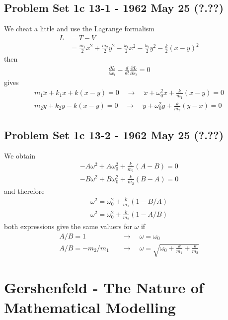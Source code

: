\documentclass[10pt,a4paper]{book}
\theoremstyle{definition}
\begin{document}
\subsection{Problem Set 1c 13-1 - 1962 May 25 (?.??)}
We cheat a little and use the Lagrange formalism 
\begin{align}
L&=T-V\\
&=\frac{m_1}{2}\dot{x}^2+\frac{m_2}{2}\dot{y}^2-\frac{k_1}{2}x^2-\frac{k_2}{2}y^2-\frac{k}{2}(x-y)^2
\end{align}
then
\begin{align}
\frac{\partial L}{\partial x_i}-\frac{d}{dt}\frac{\partial L}{\partial\dot{x}_i}=0
\end{align}
gives
\begin{align}
m_1\ddot{x}+k_1x+k(x-y)=0\quad\rightarrow\quad \ddot{x}+\omega_0^2x+\frac{k}{m_1}(x-y)=0\\
m_2\ddot{y}+k_2y-k(x-y)=0\quad\rightarrow\quad \ddot{y}+\omega_0^2y+\frac{k}{m_2}(y-x)=0
\end{align}


\subsection{Problem Set 1c  13-2 - 1962 May 25 (?.??)}
We obtain
\begin{align}
-A\omega^2+A\omega_0^2+\frac{k}{m_1}(A-B)=0\\
-B\omega^2+B\omega_0^2+\frac{k}{m_2}(B-A)=0
\end{align}
and therefore
\begin{align}
\omega^2=\omega_0^2+\frac{k}{m_1}(1-B/A)\\
\omega^2=\omega_0^2+\frac{k}{m_2}(1-A/B)
\end{align}
both expressions give the same valuers for $\omega$ if
\begin{align}
A/B=1\quad&\rightarrow\quad \omega=\omega_0\\
A/B=-m_2/m_1\quad&\rightarrow\quad \omega=\sqrt{\omega_0+\frac{k}{m_1}+\frac{k}{m_2}}
\end{align} 

\section{{\sc Gershenfeld} - The Nature of Mathematical Modelling}
\end{document}
